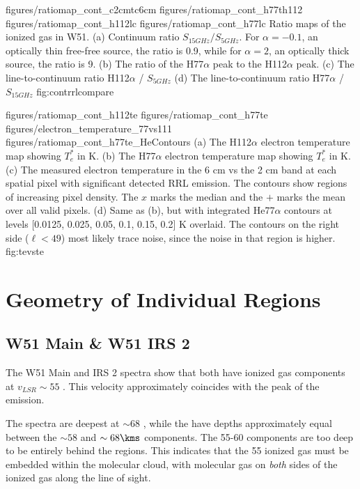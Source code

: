 \FigureFour
{figures/ratiomap_cont_c2cmtc6cm}
{figures/ratiomap_cont_h77th112}
{figures/ratiomap_cont_h112lc}
{figures/ratiomap_cont_h77lc}
{Ratio maps of the ionized gas in W51.  
(a) Continuum ratio $S_{15 GHz} / S_{5 GHz}$.  For $\alpha=-0.1$, an optically
thin free-free source, the ratio is 0.9, while for $\alpha=2$, an optically thick source,
the ratio is 9.
(b) The ratio of the H77$\alpha$ peak to the H112$\alpha$ peak.
(c) The line-to-continuum ratio H112$\alpha$ / $S_{5 GHz}$
(d) The line-to-continuum ratio H77$\alpha$ / $S_{15 GHz}$
}
{fig:contrrlcompare}

\FigureFourPDF
{figures/ratiomap_cont_h112te}
{figures/ratiomap_cont_h77te}
{figures/electron_temperature_77vs111}
{figures/ratiomap_cont_h77te_HeContours}
{(a) The H112$\alpha$ electron temperature map showing $T_e^*$ in K. 
(b) The H77$\alpha$ electron temperature map showing $T_e^*$ in K.
(c) The measured electron temperature in the 6 cm vs the 2 cm band at each spatial
pixel with significant detected RRL emission.  The contours show regions of
increasing pixel density.  The $x$ marks the median and the $+$ marks the mean
over all valid pixels.
(d) Same as (b), but with integrated He77$\alpha$ contours at levels [0.0125,
0.025, 0.05, 0.1, 0.15, 0.2] K \kms overlaid.  The contours on the right side
($\ell<49$) most likely trace noise, since the noise in that region is higher.
}
{fig:tevste}%

\section{Geometry of Individual Regions}
\label{appendix:geometry}
\subsection{W51 Main \& W51 IRS 2}
The W51 Main and IRS 2 spectra show that both have ionized gas components at
$v_{LSR}\sim 55$ \kms.  This velocity approximately coincides with the peak of
the \thirteenco emission.

The \formaldehyde \oneone spectra are deepest at $\sim68$ \kms, while the
\twotwo have depths approximately equal between the $\sim58$ \kms and $\sim 68
\kms$ components.  The 55-60 \kms components are too deep to be entirely behind
the \hii regions.  This indicates that the 55 \kms ionized gas must be embedded
within the molecular cloud, with molecular gas on \emph{both} sides of the
ionized gas along the line of sight.

